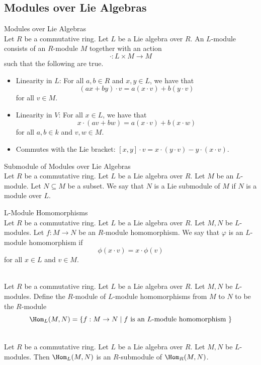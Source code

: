 \documentclass[a4paper]{article}
\begin{document}
\subsection{Modules over Lie Algebras}
\begin{defn}{Modules over Lie Algebras}{}\\
Let $R$ be a commutative ring. Let $L$ be a Lie algebra over $R$. An $L$-module consists of an $R$-module $M$ together with an action $$\cdot:L\times M\to M$$ such that the following are true. 
\begin{itemize}
\item Linearity in $L$: For all $a,b\in R$ and $x,y\in L$, we have that $$(ax+by)\cdot v=a(x\cdot v)+b(y\cdot v)$$ for all $v\in M$. 
\item Linearity in $V$: For all $x\in L$, we have that $$x\cdot(av+bw)=a(x\cdot v)+b(x\cdot w)$$ for all $a,b\in k$ and $v,w\in M$. 
\item Commutes with the Lie bracket: $[x,y]\cdot v=x\cdot(y\cdot v)-y\cdot(x\cdot v)$. 
\end{itemize}
\end{defn}

\begin{defn}{Submodule of Modules over Lie Algebras}{}\\
Let $R$ be a commutative ring. Let $L$ be a Lie algebra over $R$. Let $M$ be an $L$-module. Let $N\subseteq M$ be a subset. We say that $N$ is a Lie submodule of $M$ if $N$ is a module over $L$. 
\end{defn}

\begin{defn}{L-Module Homomorphisms}{}\\
Let $R$ be a commutative ring. Let $L$ be a Lie algebra over $R$. Let $M,N$ be $L$-modules. Let $f:M\to N$ be an $R$-module homomorphism. We say that $\varphi$ is an $L$-module homomorphism if $$\phi(x\cdot v)=x\cdot\phi(v)$$ for all $x\in L$ and $v\in M$. 
\end{defn}

\begin{defn}{}{}\\
Let $R$ be a commutative ring. Let $L$ be a Lie algebra over $R$. Let $M,N$ be $L$-modules. Define the $R$-module of $L$-module homomorphisms from $M$ to $N$ to be the $R$-module $$\Hom_L(M,N)=\{f:M\to N\;|\;f\text{ is an }L\text{-module homomorphism }\}$$
\end{defn}

\begin{lmm}{}{}\\
Let $R$ be a commutative ring. Let $L$ be a Lie algebra over $R$. Let $M,N$ be $L$-modules. Then $\Hom_L(M,N)$ is an $R$-submodule of $\Hom_R(M,N)$. 
\end{lmm}
\end{document}
